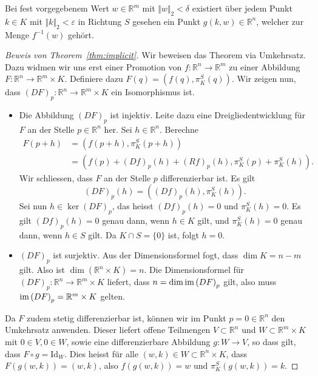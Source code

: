 \documentclass[../main.tex]{subfiles}
\begin{document}
\begin{geometric}
  Bei fest vorgegebenem Wert $w \in \mathbb{R}^m$ 
  mit $\Vert w \Vert_2 < \delta$ 
  existiert über jedem Punkt $k \in K$ 
  mit $\Vert k \Vert_2 < \varepsilon$ 
  in Richtung $S$ gesehen ein
  Punkt $g(k, w) \in \mathbb{R}^n$,
  welcher zur Menge $f^{-1}(w)$ gehört.
\end{geometric}

\begin{proof}[Beweis von Theorem~\ref{thm:implicit}]
  Wir beweisen das Theorem via Umkehrsatz.
  Dazu widmen wir uns erst einer Promotion
  von $f \colon \mathbb{R}^n \to \mathbb{R}^m$ 
  zu einer Abbildung
  $F \colon \mathbb{R}^n \to \mathbb{R}^m \times K$.
  Definiere dazu $F(q) = (f(q), \pi_K^S(q))$.
  Wir zeigen nun, dass ${(DF)}_p \colon \mathbb{R}^n \to
  \mathbb{R}^m \times K$ 
  ein Isomorphismus ist.
  \begin{itemize}
    \item Die Abbildung ${(DF)}_p$
      ist injektiv.
      Leite dazu eine Dreigliedentwicklung für $F$ an
      der Stelle $p \in \mathbb{R}^n$ her.
      Sei $h \in \mathbb{R}^n$.
      Berechne
      \begin{align*}
        F(p+h)
        & = (f(p + h), \pi_K^S(p + h)) \\
        &= (f(p) + {(Df)}_p(h) + {(Rf)}_p(h), \pi_K^S(p) + \pi_K^S(h)).
      \end{align*}
      Wir schliessen, dass $F$
      an der Stelle  $p$ differenzierbar ist.
      Es gilt \[{(DF)}_p(h) = ({(Df)}_p(h), \pi_K^S(h)).\]
      Sei nun $h \in \ker {(DF)}_p$, das heisst
      ${(Df)}_p(h) = 0$ und $\pi_K^S(h) = 0$.
      Es gilt ${(Df)}_p(h) = 0$ genau dann,
      wenn $h \in K$ gilt, und $\pi_K^S(h) = 0$ genau dann,
      wenn $h \in S$ gilt. Da $K \cap S = \{0\}$ ist, folgt $h = 0$.
    \item ${(DF)}_p$ ist surjektiv.
      Aus der Dimensionsformel fogt, dass $\dim K = n - m$ gilt.
      Also ist $\dim (\mathbb{R}^n \times K) = n$.
      Die Dimensionsformel für 
      ${(DF)}_p \colon \mathbb{R}^n \to \mathbb{R}^m \times K$ 
      liefert, dass $n = \dim \operatorname{im} {(DF)}_p$ gilt, also muss
      $\operatorname{im} {(DF)}_p = \mathbb{R}^m \times K$ gelten.
  \end{itemize}
  Da $F$ zudem stetig differenzierbar ist,
  können wir im Punkt $p = 0 \in \mathbb{R}^n$ den Umkehrsatz anwenden.
  Dieser liefert offene Teilmengen
  $V \subset \mathbb{R}^n$ und $W \subset \mathbb{R}^m \times K$ 
  mit $0 \in V, 0 \in W$,
  sowie eine differenzierbare Abbildung $g \colon W \to V$,
  so dass gilt, dass $F \circ g = \text{Id}_W$.
  Dies heisst für alle $(w, k) \in W \subset \mathbb{R}^n \times K$,
  dass $F(g(w, k)) = (w, k)$, also
  $f(g(w, k)) = w$ 
  und $\pi_K^S(g(w, k)) = k$.


\end{proof}
\end{document}
